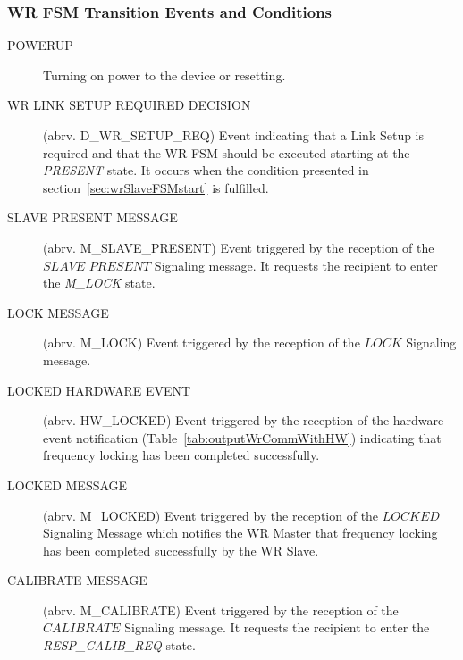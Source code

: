 \documentclass[a4paper, 12pt]{article}
\makeatletter
\renewcommand\paragraph{\@startsection{paragraph}{4}{\z@}%
                                     {-3.25ex\@plus -1ex \@minus -.2ex}%
                                     {0.0001pt \@plus .2ex}%
                                     {\normalfont\normalsize\bfseries}}
\makeatother
\begin{document}
\newpage


\subsubsection{WR FSM Transition Events and Conditions}
\label{sec:wrEventsAndConditions}
\begin{description}
\item[POWERUP]				Turning on power to the device or resetting.

\item[WR LINK SETUP REQUIRED DECISION] 	(abrv. D\_WR\_SETUP\_REQ) 	Event indicating that a 
      Link Setup is required and that the WR FSM should be executed starting at the
      \textit{PRESENT} state. It occurs when the condition presented in 
      section~\ref{sec:wrSlaveFSMstart} is fulfilled.

\item[SLAVE PRESENT MESSAGE] 		(abrv. M\_SLAVE\_PRESENT) 	Event triggered by the 
      reception of the $SLAVE\_PRESENT$ Signaling message. It requests the recipient to enter 
      the \textit{M\_LOCK} state.

\item[LOCK MESSAGE] 			(abrv. M\_LOCK) 		Event triggered by the 
      reception of the $LOCK$ Signaling message.

\item[LOCKED HARDWARE EVENT] 		(abrv. HW\_LOCKED) 		Event triggered by the 
      reception of the hardware event notification (Table~\ref{tab:outputWrCommWithHW}) indicating 
      that frequency locking has been completed successfully.

\item[LOCKED MESSAGE] 			(abrv. M\_LOCKED)		Event triggered by the 
      reception of the $LOCKED$ Signaling Message which notifies the WR Master that frequency 
      locking has been completed successfully by the WR Slave.

\item[CALIBRATE MESSAGE] 		(abrv. M\_CALIBRATE) 		Event triggered by the 
      reception of the $CALIBRATE$ Signaling message. It requests the recipient to enter the \\
      \textit{RESP\_CALIB\_REQ} state.


\end{description}
\end{document}
